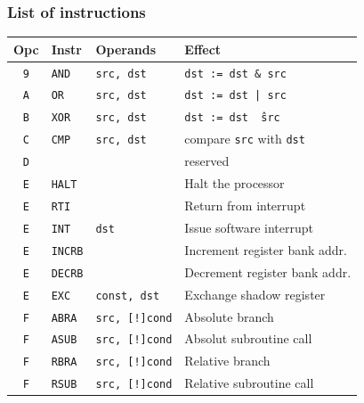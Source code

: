 \documentclass{beamer}
\begin{document}
   \begin{frame}
    \frametitle{List of instructions}
    \begin{center}
     \begin{tabular}{|c|ll|l|}
      \hline
       Opc&Instr&Operands&Effect\\
      \hline
       {\tt 9}&{\tt AND}&{\tt src, dst}&{\tt dst := dst \& src}\\
       {\tt A}&{\tt OR}&{\tt src, dst}&{\tt dst := dst | src}\\
       {\tt B}&{\tt XOR}&{\tt src, dst}&{\tt dst := dst \^\ src}\\
       {\tt C}&{\tt CMP}&{\tt src, dst}&compare {\tt src} with {\tt dst}\\ 
       {\tt D}&&&reserved\\
       {\tt E}&{\tt HALT}&&Halt the processor\\
       {\tt E}&{\tt RTI}&&Return from interrupt\\
       {\tt E}&{\tt INT}&\texttt{dst}&Issue software interrupt\\
       {\tt E}&{\tt INCRB}&&Increment register bank addr.\\
       {\tt E}&{\tt DECRB}&&Decrement register bank addr.\\
       {\tt E}&{\tt EXC}&{\tt const, dst}&Exchange shadow register\\
       {\tt F}&{\tt ABRA}&{\tt src, [!]cond}&Absolute branch\\
       {\tt F}&{\tt ASUB}&{\tt src, [!]cond}&Absolut subroutine call\\
       {\tt F}&{\tt RBRA}&{\tt src, [!]cond}&Relative branch\\
       {\tt F}&{\tt RSUB}&{\tt src, [!]cond}&Relative subroutine call\\
      \hline
     \end{tabular}
    \end{center}
   \end{frame}
%
\end{document}
